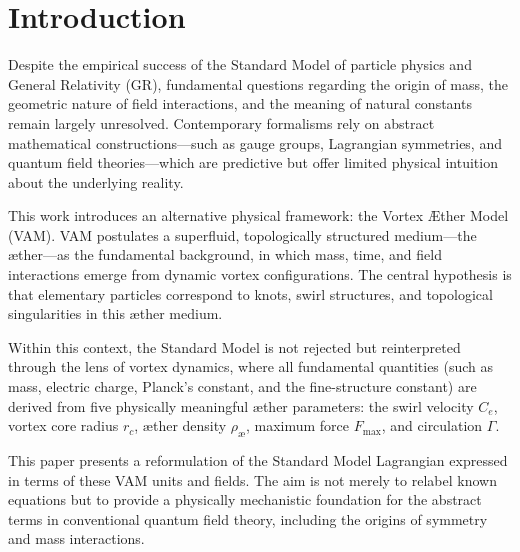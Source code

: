 \section{Introduction}\label{sec:inleiding}
Despite the empirical success of the Standard Model of particle physics and General Relativity (GR), fundamental questions regarding the origin of mass, the geometric nature of field interactions, and the meaning of natural constants remain largely unresolved. Contemporary formalisms rely on abstract mathematical constructions—such as gauge groups, Lagrangian symmetries, and quantum field theories—which are predictive but offer limited physical intuition about the underlying reality.

This work introduces an alternative physical framework: the Vortex Æther Model (VAM). VAM postulates a superfluid, topologically structured medium—the æther—as the fundamental background, in which mass, time, and field interactions emerge from dynamic vortex configurations. The central hypothesis is that elementary particles correspond to knots, swirl structures, and topological singularities in this æther medium.

Within this context, the Standard Model is not rejected but reinterpreted through the lens of vortex dynamics, where all fundamental quantities (such as mass, electric charge, Planck’s constant, and the fine-structure constant) are derived from five physically meaningful æther parameters: the swirl velocity $C_e$, vortex core radius $r_c$, æther density $\rho_\text{\ae}$, maximum force $F_\text{max}$, and circulation $\Gamma$.

This paper presents a reformulation of the Standard Model Lagrangian expressed in terms of these VAM units and fields. The aim is not merely to relabel known equations but to provide a physically mechanistic foundation for the abstract terms in conventional quantum field theory, including the origins of symmetry and mass interactions.
